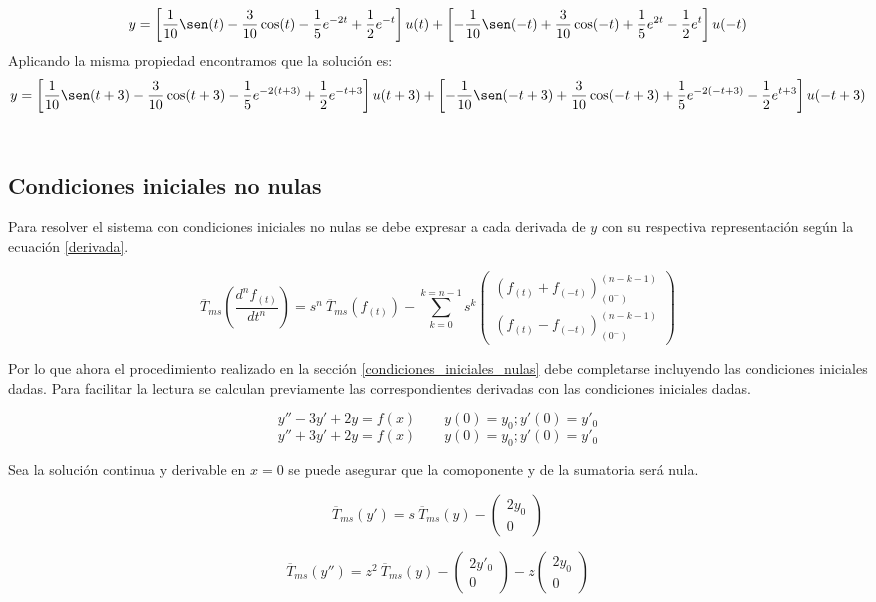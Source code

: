 \documentclass[12pt]{article}
\begin{document}
\begin{itemize}
{\footnotesize
$$y= \left[\frac{1}{10}\sen(t)-\frac{3}{10}\cos(t)-\frac{1}{5} e^{-2t}+\frac{1}{2} e^{-t}\right] u(t)+ \left[-\frac{1}{10}\sen(-t)+\frac{3}{10}\cos(-t)+\frac{1}{5} e^{2t}-\frac{1}{2} e^{t}\right] u(-t)$$
}
Aplicando la misma propiedad encontramos que la solución es:
{\tiny
$$y= \left[\frac{1}{10}\sen(t+3)-\frac{3}{10}\cos(t+3)-\frac{1}{5} e^{-2(t+3)}+\frac{1}{2} e^{-t+3}\right] u(t+3)+ \left[-\frac{1}{10}\sen(-t+3)+\frac{3}{10}\cos(-t+3)+\frac{1}{5} e^{-2(-t+3)}-\frac{1}{2} e^{t+3}\right] u(-t+3)$$
}\\

\end{itemize}

\subsection{Condiciones iniciales no nulas}

Para resolver el sistema con condiciones iniciales no nulas se debe expresar a cada derivada de $y$ con su respectiva representación según la ecuación \ref{derivada}.

$$
\overline{T}_{ms}\left(\frac{d^n f_{(t)}}{dt^n}\right) =s^n\  \overline{T}_{ms}(f_{(t)})
- \sum\limits_{k=0}^{k=n-1} s^k
\begin{pmatrix}
 (f_{(t)} + f_{(-t)})^{(n-k-1)}_{(0^-)}\\[0.5 cm]
 (f_{(t)} - f_{(-t)})^{(n-k-1)}_{(0^-)}
\end{pmatrix}
$$

Por lo que ahora el procedimiento realizado en la sección \ref{condiciones_iniciales_nulas} debe completarse incluyendo las condiciones iniciales dadas.
Para facilitar la lectura se calculan previamente las correspondientes derivadas con las condiciones iniciales dadas.

$$
y''-3y'+2y=f(x) \qquad y(0)=y_0 ; y'(0)=y'_0
$$
$$
y''+3y'+2y=f(x) \qquad y(0)=y_0 ; y'(0)=y'_0
$$


Sea la solución continua y derivable en $x=0$ se puede asegurar que la comoponente y de la sumatoria será nula.

$$
\overline{T}_{ms}\left(y'\right) =s\  \overline{T}_{ms}(y)
-
\begin{pmatrix}
2y_0 \\[0.5 cm]
0
\end{pmatrix}
$$

$$
\overline{T}_{ms}\left(y''\right) =z^2\  \overline{T}_{ms}(y)
-
\begin{pmatrix}
2y'_0 \\[0.5 cm]
0
\end{pmatrix}
-z
\begin{pmatrix}
2y_0 \\[0.5 cm]
0
\end{pmatrix}
$$
\end{document}
